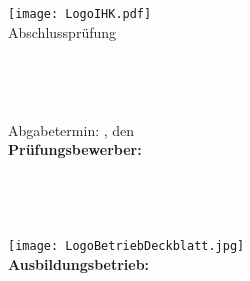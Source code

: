 \begin{titlepage}
	\begin{center}
		\texttt{[image: LogoIHK.pdf]}\\[1ex]
		\Large{Abschlussprüfung \pruefungstermin}\\[3ex]
		
		\Large{\ausbildungsberuf}\\
		\LARGE{\betreff}\\[2ex]
		
		\huge{\textbf{\titel}}\\[1.5ex]
		\Large{\textbf{\untertitel}}\\[4ex]
		
		\normalsize
		Abgabetermin: \abgabeOrt, den \abgabeTermin\\[1em]
		\textbf{Prüfungsbewerber:}\\
		\autorName\\
		\autorPfnr \\
		\autorAnschrift\\
		\autorOrt\\[5ex]
		
		\texttt{[image: LogoBetriebDeckblatt.jpg]}\\[2ex]
		\textbf{Ausbildungsbetrieb:}\\
		\betriebName\\
		\betriebAnschrift\\
		\betriebOrt\\[5em]
	\end{center}
\end{titlepage}
